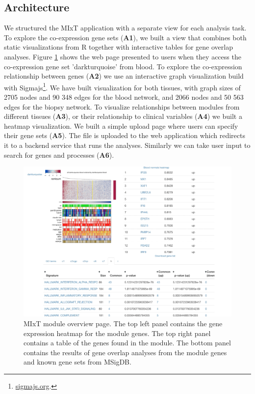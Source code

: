 \subsection{Architecture} 
We structured the MIxT application with a separate view for each analysis task.
To explore the co-expression gene sets (\textbf{A1}), we built a view that
combines both static visualizations from R together with interactive tables for
gene overlap analyses. Figure \ref{fig_first_case} shows the web page presented
to users when they access the co-expression gene set 'darkturquoise' from blood.
To explore the co-expression relationship between genes (\textbf{A2}) we use an
interactive graph visualization build with Sigmajs\footnote{\url{sigmajs.org}.}.
We have built visualization for both tissues, with graph sizes of 2705 nodes and
90 348 edges for the blood network, and 2066 nodes and 50 563 edges for the
biopsy network. 
To visualize relationships between modules from different tissues (\textbf{A3}),
or their relationship to clinical variables (\textbf{A4}) we built a heatmap
visualization.
We built a simple upload page where users can specify their gene sets
(\textbf{A5}). The file is uploaded to the web application which redirects it to
a backend service that runs the analyses. Similarly we can take user input to
search for genes and processes (\textbf{A6}).

\begin{figure}[h!]
\centering
\includegraphics[width=\columnwidth]{figures/module.png}
\caption{MIxT module overview page.
The top left panel
contains the gene expression heatmap for the module genes. The top right panel
contains a table of the genes found in the module. The bottom panel contains the
results of gene overlap analyses from the module genes and known gene sets from
MSigDB.}
\label{fig_first_case}
\end{figure} 


